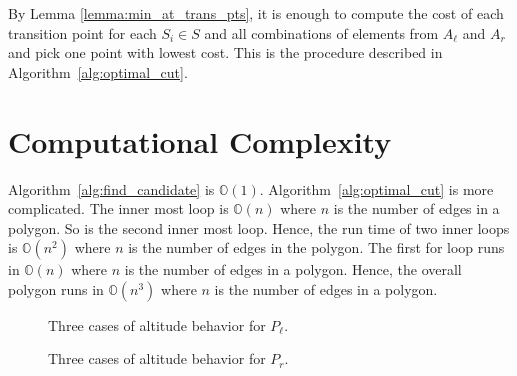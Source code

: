 \documentclass[../main.tex]{subfiles}
\begin{document}
By Lemma \ref{lemma:min_at_trans_pts}, it is enough to compute the cost of each transition point for each $S_i\in S$ and all combinations of elements from $A_{\ell}$ and $A_r$ and pick one point with lowest cost. This is the procedure described in Algorithm~\ref{alg:optimal_cut}.

\section{Computational Complexity}
\label{section:single_agent_complexity}
Algorithm~\ref{alg:find_candidate} is $\mathbb{O}(1)$. Algorithm~\ref{alg:optimal_cut} is more complicated. The inner most loop is $\mathbb{O}(n)$ where $n$ is the number of edges in a polygon. So is the second inner most loop. Hence, the run time of two inner loops is $\mathbb{O}(n^2)$ where $n$ is the number of edges in the polygon. The first for loop runs in $\mathbb{O}(n)$ where $n$ is the number of edges in a polygon. Hence, the overall polygon runs in $\mathbb{O}(n^3)$ where $n$ is the number of edges in a polygon.

\begin{figure}
	\centering
	\begin{subfigure}{0.45\linewidth}
		\centering
		
		\caption{\label{fig:altitude_case_i}}
	\end{subfigure}%
	\quad
	\begin{subfigure}{0.45\linewidth}
		\centering
		
		\caption{\label{fig:altitude_case_ii}}
	\end{subfigure}
	\begin{subfigure}{0.45\linewidth}
		\centering
		
		\caption{\label{fig:altitude_case_iii}}
	\end{subfigure}
	\caption{Three cases of altitude behavior for $P_{\ell}$.}
	\label{fig:altitude_cases_pl}
\end{figure}

\begin{figure}
	\centering
	\begin{subfigure}{0.45\linewidth}
		\centering
		
		\caption{\label{fig:altitude_case_pr_i}}
	\end{subfigure}%
	\quad
	\begin{subfigure}{0.45\linewidth}
		\centering
		
		\caption{\label{fig:altitude_case_pr_ii}}
	\end{subfigure}
	\begin{subfigure}{0.45\linewidth}
		\centering
		
		\caption{\label{fig:altitude_case_pr_iii}}
	\end{subfigure}
	\caption{Three cases of altitude behavior for $P_r$.}
	\label{fig:altitude_cases_pr}
\end{figure}
\end{document}
